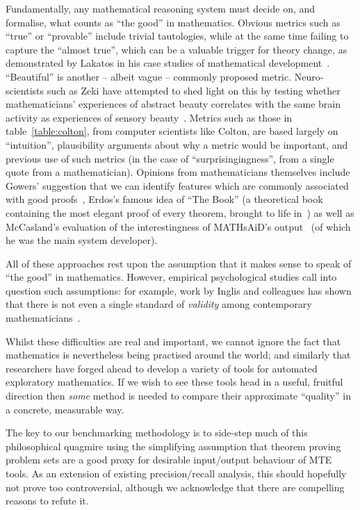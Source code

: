 Fundamentally, any mathematical reasoning system must decide on, and formalise,
what counts as ``the good'' in mathematics.  Obvious metrics such as ``true'' or
``provable'' include trivial tautologies, while at the same time failing to
capture the ``almost true'', which can be a valuable trigger for theory change,
as demonstrated by Lakatos in his case studies of mathematical
development~\cite{lakatos}. ``Beautiful'' is another -- albeit vague -- commonly
proposed metric. Neuro-scientists such as Zeki \etal{} have attempted to shed
light on this by testing whether mathematicians' experiences of abstract beauty
correlates with the same brain activity as experiences of sensory
beauty~\cite{10.3389/fnhum.2014.00068}. Metrics such as those in
table~\ref{table:colton}, from computer scientists like Colton, are based
largely on ``intuition'', plausibility arguments about why a metric would be
important, and previous use of such metrics (in the case of
``surprisingingness'', from a single quote from a mathematician).
Opinions from mathematicians themselves include Gowers' suggestion that we can
identify features which are commonly associated with good
proofs~\cite{gowers2000two}, Erdos's famous idea of ``The Book'' (a theoretical
book containing the most elegant proof of every theorem, brought to life
in~\cite{aigner2010proofs}) as well as McCasland's evaluation of the
interestingness of MATHsAiD's output~\cite{roy} (of which he was the main system
developer).

All of these approaches rest upon the assumption that it makes sense to speak of
``the good'' in mathematics. However, empirical psychological studies
call into question such assumptions: for example, work by Inglis and colleagues
has shown that there is not even a single standard of \emph{validity} among
contemporary mathematicians~\cite{inglis2013mathematicians}.

Whilst these difficulties are real and important, we cannot ignore the fact that
mathematics is nevertheless being practised around the world; and similarly that
researchers have forged ahead to develop a variety of tools for automated
exploratory mathematics. If we wish to see these tools head in a useful,
fruitful direction then \emph{some} method is needed to compare their
approximate ``quality'' in a concrete, measurable way.

The key to our benchmarking methodology is to side-step much of this
philosophical quagmire using the simplifying assumption that theorem proving
problem sets are a good proxy for desirable input/output behaviour of MTE tools.
As an extension of existing precision/recall analysis, this should hopefully not
prove too controversial, although we acknowledge that there are compelling
reasons to refute it.


